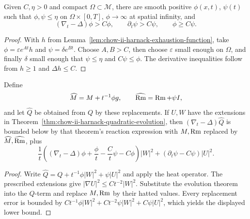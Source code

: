 \begin{lemma}
\label{lem:chow-ii-harnack-barrier-functions}


Given \(C,\eta>0\) and compact \(\Omega\subset\mathcal M\), there are smooth
positive \(\phi(x,t)\), \(\psi(t)\) such that \(\phi,\psi\le\eta\) on
\(\Omega\times[0,T]\), \(\phi\to\infty\) at spatial infinity, and
\[
(\nabla_t-\Delta)\phi>C\phi,\qquad \partial_t\psi>C\psi,
\qquad \phi\ge C\psi.
\]
\end{lemma}
\begin{proof}
\sketch With \(h\) from Lemma~\ref{lem:chow-ii-harnack-exhaustion-function}, take
\(\phi=\varepsilon e^{At}h\) and \(\psi=\delta e^{Bt}\).  Choose
\(A,B>C\), then choose \(\varepsilon\) small enough on \(\Omega\), and
finally \(\delta\) small enough that \(\psi\le\eta\) and
\(C\psi\le\phi\).  The derivative inequalities follow from
\(h\ge1\) and \(\Delta h\le C\).
\end{proof}

\begin{lemma}
\label{lem:chow-ii-perturbed-harnack-evolution}


Define
\[
\widehat{M}=M+t^{-1}\phi g,\qquad \widehat{\operatorname{Rm}}=\operatorname{Rm}+\psi I,
\]
and let \(\widehat Q\) be obtained from \(Q\) by these replacements.  If
\(U,W\) have the extensions in
Theorem~\ref{thm:chow-ii-harnack-quadratic-evolution}, then
\((\nabla_t-\Delta)\widehat Q\) is bounded below by that theorem's reaction
expression with \(M,\operatorname{Rm}\) replaced by \(\widehat{M},\widehat{\operatorname{Rm}}\), plus
\[
\frac1t\left((\nabla_t-\Delta)\phi+\frac\phi t-\frac C t\psi-C\phi\right)|W|^2
+(\partial_t\psi-C\psi)|U|^2.
\]
\end{lemma}
\begin{proof}
\sketch Write \(\widehat Q=Q+t^{-1}\phi|W|^2+\psi|U|^2\) and apply the heat
operator.  The prescribed extensions give
\(|\nabla U|^2\le Ct^{-2}|W|^2\).  Substitute the evolution theorem into the
\(Q\)-term and replace \(M,\operatorname{Rm}\) by their hatted values.  Every replacement
error is bounded by \(Ct^{-1}\phi|W|^2+Ct^{-2}\psi|W|^2+C\psi|U|^2\),
which yields the displayed lower bound.
\end{proof}

